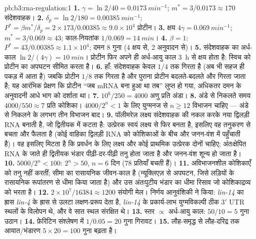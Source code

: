 \begin{solution}{pb:b3:rna-regulation:1}
\textbf{1.} $\gamma = \ln 2/40 = \qty{0.0173}{min^{-1}}$; $m^{*} =
3/0.0173 \approx 170$ संदेशवाहक।
\textbf{2.} $\delta_{p} = \ln 2/180 = \qty{0.00385}{min^{-1}}$; $P^{*} =
\beta m^{*}/\delta_{p} = 2\times 173/0.00385 \approx 9.0\times 10^{4}$
प्रोटीन।
\textbf{3.} क्षय $4\gamma = \qty{0.069}{min^{-1}}$; $m^{*} = 3/0.069
\approx 43$; काल-नियतांक $1/0.069 = \qty{14}{min}$।
\textbf{4.} $\beta = 1$: $P^{*} = 43/0.00385 \approx 1.1\times 10^{4}$;
दमन $8$ गुना ($4$ क्षय से, $2$ अनुवादन से)।
\textbf{5.} संदेशवाहक का अर्ध-काल $\ln 2/(4\gamma) = \qty{10}{min}$।
प्रोटीन फिर अपने ही अर्ध-आयु काल \qty{3}{h} से क्षय होता है: स्विच को
प्रोटीन का अपघटन सीमित करता है।
\textbf{6.} हाँ: संदेशवाहक केवल $1/4$ तक गिरता है (अब भी सहज ही
पकड़ में आता है) जबकि प्रोटीन $1/8$ तक गिरता है और पुराना प्रोटीन
बदलते-बदलते और गिरता जाता है; यह आरंभिक प्रेक्षण कि प्रोटीन ``जब mRNA
बना हुआ था तब'' लुप्त हो गया, अधिकतर दमन के अनुवादनी आधे भाग को
दर्शाता था।
\textbf{7.} $10^{6}/250 = 4000$ अणु प्रति अंडा।
\textbf{8.} अंडे से निकलते समय $4000/550 \approx 7$ प्रति कोशिका।
$4000/2^{n} < 1$ के लिए युग्मनज से $n \ge 12$ विभाजन चाहिए ---
अंडे से निकलने के लगभग तीन विभाजन बाद।
\textbf{9.} पॉलीमरेज़ लक्ष्य संदेशवाहक की नकल करके नया द्विलड़ी RNA
बनाती है, जो द्वितीयक  में कटता है: उत्प्रेरक स्वयं लक्ष्य से फिर
बनता है, इसलिए वह तनुकरण से बचता और फैलता है (कोई वाहिका द्विलड़ी RNA
को कोशिकाओं के बीच और जनन-वंश में पहुँचाती है)। वह इसलिए मिटता है कि
प्रवर्धन के लिए लक्ष्य और कोई प्राथमिक उत्प्रेरक दोनों चाहिए; अंतःक्षेपित
RNA के जाते ही द्वितीयक भंडार पीढ़ी-दर-पीढ़ी तनु होता जाता है और
जनन-वंश शून्य हो जाता है।
\textbf{10.} $5000/2^{n} < 100$: $2^{n} > 50$, $n = 6$ दिन ($78$
प्रतियाँ बचती हैं)।
\textbf{11.} अविभाजनशील कोशिकाएँ  को तनु नहीं करतीं; सीमा  का
रासायनिक जीवन-काल है (न्यूक्लिएज़ से अपघटन, जिसे लड़ियों के रासायनिक
रूपांतरण से धीमा किया जाता है) और उस अंतःपुटीय भंडार का धीमा रिसाव जो
कोशिकाद्रव्य को भरता है।
\textbf{12.} $2\times 10^{7}/\num{16384} \approx \num{1200}$ संयोगी
मेल। निर्णय आनुवंशिकी ने किया: \emph{lin-14} का ह्रास \emph{lin-4} के
ह्रास से उलटा लक्षण-प्ररूप देता है, \emph{lin-14} के प्रकार्य-लाभ
युग्मविकल्पी ठीक 3$'$ UTR स्थलों के विलोपन थे, और वे सात स्थल संरक्षित थे।
\textbf{13.} स्तर $\propto$ अर्ध-आयु काल: $50/10 = 5$ गुना उठान।
\textbf{14.} फ़ेरिटिन संश्लेषण में $1/0.05 = 20$ गुना गिरावट।
\textbf{15.} लौह-समृद्ध से लौह-दरिद्र तक आयात/भंडारण $5\times 20 = 100$
गुना बढ़ता है।

\end{solution}
